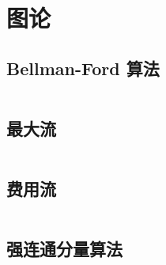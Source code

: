 \section{图论}

\subsection{Bellman-Ford 算法}

\inputminted{cpp}{icpc/graph/shortest_path/bf.cpp}

\subsection{最大流}

\inputminted{cpp}{icpc/graph/maxflow/maxflow.cpp}

\subsection{费用流}

\inputminted{cpp}{icpc/graph/SSP/SSP.cpp}

\subsection{强连通分量算法}

\inputminted{cpp}{icpc/graph/scc/scc.cpp}
